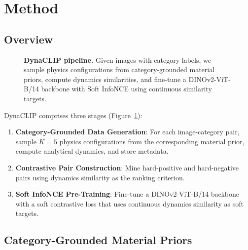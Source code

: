 \documentclass{article}
\newcommand{\methodname}{DynaCLIP}
\begin{document}
\section{Method}
\label{sec:method}

\subsection{Overview}
\label{sec:overview}

\begin{figure}[t]
\centering
{}
\caption{\textbf{\methodname{} pipeline.} Given images with category labels, we sample physics configurations from category-grounded material priors, compute dynamics similarities, and fine-tune a DINOv2-ViT-B/14 backbone with Soft InfoNCE using continuous similarity targets.}
\label{fig:method}
\end{figure}

\methodname{} comprises three stages (Figure~\ref{fig:method}):
\begin{enumerate}
    \item \textbf{Category-Grounded Data Generation}: For each image-category pair, sample $K{=}5$ physics configurations from the corresponding material prior, compute analytical dynamics, and store metadata.
    \item \textbf{Contrastive Pair Construction}: Mine hard-positive and hard-negative pairs using dynamics similarity as the ranking criterion.
    \item \textbf{Soft InfoNCE Pre-Training}: Fine-tune a DINOv2-ViT-B/14 backbone with a soft contrastive loss that uses continuous dynamics similarity as soft targets.
\end{enumerate}


\subsection{Category-Grounded Material Priors}
\label{sec:priors}
\end{document}
